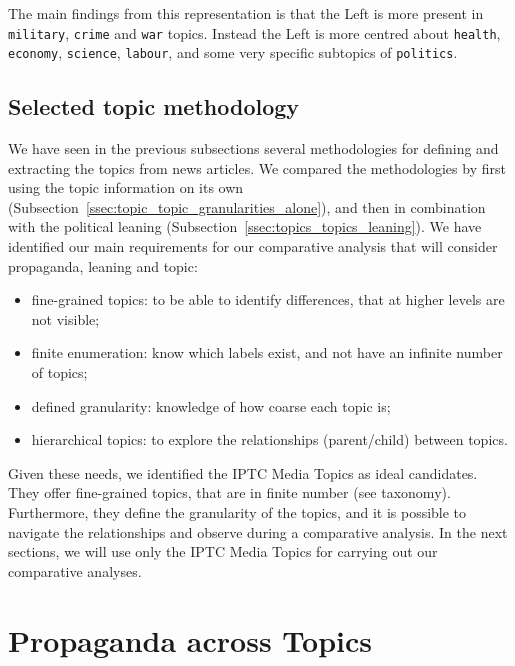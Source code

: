 The main findings from this representation is that the Left is more present in \texttt{military}, \texttt{crime} and \texttt{war} topics. Instead the Left is more centred about \texttt{health}, \texttt{economy}, \texttt{science}, \texttt{labour}, and some very specific subtopics of \texttt{politics}.


\subsection{\statusgreen Selected topic methodology}
\label{ssec:topic_topic_choice}

We have seen in the previous subsections several methodologies for defining and extracting the topics from news articles.
We compared the methodologies by first using the topic information on its own (Subsection~\ref{ssec:topic_topic_granularities_alone}), and then in combination with the political leaning (Subsection~\ref{ssec:topics_topics_leaning}).
We have identified our main requirements for our comparative analysis that will consider propaganda, leaning and topic:

\begin{itemize}
    \item fine-grained topics: to be able to identify differences, that at higher levels are not visible;
    \item finite enumeration: know which labels exist, and not have an infinite number of topics;
    \item defined granularity: knowledge of how coarse each topic is; %
    \item hierarchical topics: to explore the relationships (parent/child) between topics.
\end{itemize}

Given these needs, we identified the IPTC Media Topics as ideal candidates.
They offer fine-grained topics, that are in finite number (see taxonomy). Furthermore, they define the granularity of the topics, and it is possible to navigate the relationships and observe during a comparative analysis.
In the next sections, we will use only the IPTC Media Topics for carrying out our comparative analyses.


\section{\statusgreen Propaganda across Topics}
\label{sec:topic_propaganda}

